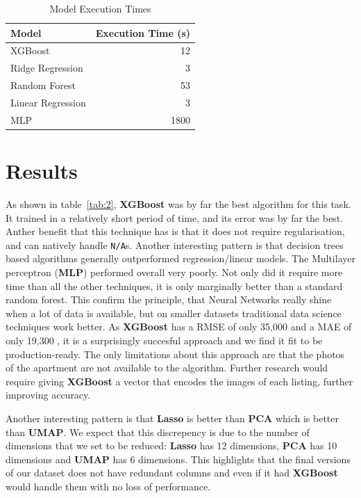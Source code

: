\documentclass{article}
\begin{document}
\begin{table}[htbp]
\centering
\caption{Model Execution Times}
\label{tab:1}
\begin{tabular}{lr}
\toprule
\textbf{Model} & \textbf{Execution Time (s)} \\ 
\midrule
XGBoost & 12 \\
Ridge Regression & 3 \\
Random Forest & 53 \\
Linear Regression & 3 \\
MLP & 1800 \\
\bottomrule
\end{tabular}
\end{table}

\section{Results}
As shown in table~\ref{tab:2}, \textbf{XGBoost} was by far the best algorithm for this task. It trained in a relatively short period of time, and its error was by far the best. Anther benefit that this technique has is that it does not require regularisation, and can natively handle \texttt{N/A}s.
Another interesting pattern is that decision trees based algorithms generally outperformed regression/linear models. The Multilayer perceptron (\textbf{MLP}) performed overall very poorly. Not only did it require more time than all the other techniques, it is only marginally better than a standard random forest. This confirm the principle, that Neural Networks really shine when a lot of data is available, but on smaller datasets traditional data science techniques work better.
As \textbf{XGBoost} has a RMSE of only 35{,}000 and a MAE of only 19{,}300 , it is a surprisingly succesful approach and we find it fit to be production-ready. The only limitations about this approach are that the photos of the apartment are not available to the algorithm. Further research would require giving \textbf{XGBoost} a vector that encodes the images of each listing, further improving accuracy. 


Another interesting pattern is that \textbf{Lasso} is better than \textbf{PCA} which is better than \textbf{UMAP}. We expect that this discrepency is due to the number of dimensions that we set to be reduced: \textbf{Lasso} has 12 dimensions, \textbf{PCA} has 10 dimensions and \textbf{UMAP} has 6 dimensions. This highlights that the final versions of our dataset does not have redundant columns and even if it had \textbf{XGBoost} would handle them with no loss of performance.    
\end{document}
